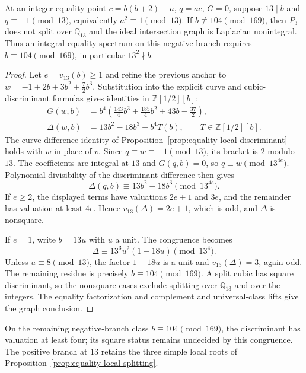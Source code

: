 \begin{proposition}
\label{prop:equality-thirteen}
At an integer equality point $c=b(b+2)-a$, $q=ac$, $G=0$, suppose
$13\mid b$ and $q\equiv-1\pmod{13}$, equivalently $a^2\equiv1\pmod{13}$.
If $b\not\equiv104\pmod{169}$, then $P_3$ does not split over
$\mathbb Q_{13}$ and the ideal intersection graph is Laplacian
nonintegral. Thus an integral equality spectrum on this negative branch
requires $b\equiv104\pmod{169}$, in particular $13^2\nmid b$.
\end{proposition}

\begin{proof}
Let $e=v_{13}(b)\geq1$ and refine the previous anchor to
$w=-1+2b+3b^2+\frac72b^3$. Substitution into the explicit curve and
cubic-discriminant formulas gives identities in $\mathbb Z[1/2][b]$:
\begin{align*}
 G(w,b)&=b^4\left(\frac{143}{4}b^3+\frac{185}{4}b^2+43b-\frac{37}{2}\right),\\
 \Delta(w,b)&=13b^2-18b^3+b^4T(b),\qquad T\in\mathbb Z[1/2][b].
\end{align*}
The curve difference identity of
Proposition~\ref{prop:equality-local-discriminant} holds with $w$ in
place of $v$. Since $q\equiv w\equiv-1\pmod{13}$, its bracket is
$2$ modulo $13$. The coefficients are integral at $13$ and $G(q,b)=0$,
so $q\equiv w\pmod{13^{4e}}$. Polynomial divisibility of the
discriminant difference then gives
\[
 \Delta(q,b)\equiv13b^2-18b^3\pmod{13^{4e}}.
\]
If $e\geq2$, the displayed terms have valuations $2e+1$ and $3e$,
and the remainder has valuation at least $4e$. Hence
$v_{13}(\Delta)=2e+1$, which is odd, and $\Delta$ is nonsquare.

If $e=1$, write $b=13u$ with $u$ a unit. The congruence becomes
\[
 \Delta\equiv13^3u^2(1-18u)\pmod{13^4}.
\]
Unless $u\equiv8\pmod{13}$, the factor $1-18u$ is a unit and
$v_{13}(\Delta)=3$, again odd. The remaining residue is precisely
$b\equiv104\pmod{169}$. A split cubic has square discriminant,
so the nonsquare cases exclude splitting over $\mathbb Q_{13}$ and
over the integers. The equality factorization and complement and
universal-class lifts give the graph conclusion.
\end{proof}

On the remaining negative-branch class $b\equiv104\pmod{169}$,
the discriminant has valuation at least four; its square status remains
undecided by this congruence. The positive branch at $13$ retains the
three simple local roots of Proposition~\ref{prop:equality-local-splitting}.
